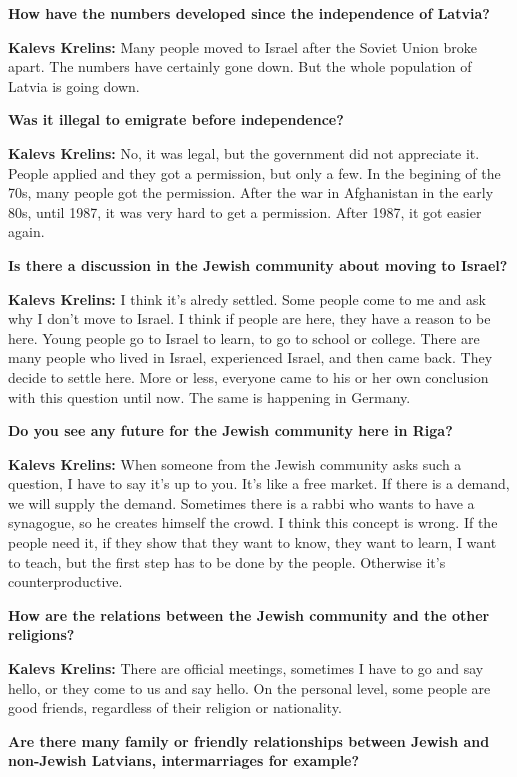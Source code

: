 \textbf{How have the numbers developed since the independence of Latvia?}  

\textbf{Kalevs Krelins:} Many people moved to Israel after the Soviet Union broke apart. The numbers have certainly gone down. But the whole population of Latvia is going down.  

\textbf{Was it illegal to emigrate before independence?} 

\textbf{Kalevs Krelins:} No, it was legal, but the government did not appreciate it. People applied and they got a permission, but only a few. In the begining of the 70s, many people got the permission. After the war in Afghanistan in the early 80s, until 1987, it was very hard to get a permission. After 1987, it got easier again. 

\textbf{Is there a discussion in the Jewish community about moving to Israel?} 

\textbf{Kalevs Krelins:} I think it's alredy settled. Some people come to me and ask why I don't move to Israel. I think if people are here, they have a reason to be here. Young people go to Israel to learn, to go to school or college. There are many people who lived in Israel, experienced Israel, and then came back. They decide to settle here. More or less, everyone came to his or her own conclusion with this question until now. The same is happening in Germany.  

\textbf{Do you see any future for the Jewish community here in Riga?} 

\textbf{Kalevs Krelins:} When someone from the Jewish community asks such a question, I have to say it’s up to you. It’s like a free market. If there is a demand, we will supply the demand. Sometimes there is a rabbi who wants to have a synagogue, so he creates himself the crowd. I think this concept is wrong. If the people need it, if they show that they want to know, they want to learn, I want to teach, but the first step has to be done by the people. Otherwise it’s counterproductive.  

\textbf{How are the relations between the Jewish community and the other religions?} 

\textbf{Kalevs Krelins:} There are official meetings, sometimes I have to go and say hello, or they come to us and say hello. On the personal level, some people are good friends, regardless of their religion or nationality.  

\textbf{Are there many family or friendly relationships between Jewish and non-Jewish Latvians, intermarriages for example?} 


